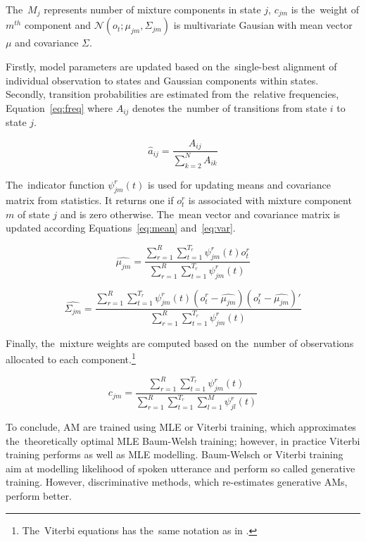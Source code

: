 The~$M_j$ represents number of mixture components in state $j$, $c_{jm}$ is the~weight of $m^{th}$ component and $\mathcal{N}(o_t; \mu_{jm}, \Sigma_{jm})$
is multivariate Gausian with mean vector $\mu$ and covariance $\Sigma$.

Firstly, model parameters are updated based on the~single-best alignment of individual observation to states and Gaussian components within states.
Secondly, transition probabilities are estimated from the~relative frequencies, Equation~\ref{eq:freq} where $A_{ij}$ denotes the~number of transitions from state $i$ to state $j$.

\begin{equation}\label{eq:freq}
    \hat{a}_{ij} = \frac{A_{ij}}{\sum_{k=2}^{N}{A_{ik}}}
\end{equation}

The~indicator function $\psi^r_{jm}(t)$ is used for updating means and covariance matrix from statistics.
It returns one if $o^r_t$ is associated with mixture component $m$ of state $j$ and is zero otherwise.
The~mean vector and covariance matrix is updated according Equations~\ref{eq:mean} and~\ref{eq:var}.

\begin{equation}\label{eq:mean}
    \hat{\mu_{jm}} = \frac{\sum_{r=1}^{R}{\sum_{t=1}^{T_r}{\psi^r_{jm}(t)o^r_t}}}  {\sum_{r=1}^{R}{\sum_{t=1}^{T_r}{\psi^r_{jm}(t)}}}
\end{equation}

\begin{equation}\label{eq:var}
    \hat{\Sigma_{jm}} = \frac{\sum_{r=1}^{R}{\sum_{t=1}^{T_r}{\psi^r_{jm}(t)(o^r_t - \hat{\mu_{jm}})(o^r_t - \hat{\mu_{jm}})'}}}  {\sum_{r=1}^{R}{\sum_{t=1}^{T_r}{\psi^r_{jm}(t)}}}
\end{equation}

Finally, the~mixture weights are computed based on the~number of observations allocated to each component.\footnote{The~Viterbi equations has the~same notation as in \cite{buthpitiya2012parallel}.}

\begin{equation}\label{eq:weights}
    c_{jm} = \frac{\sum_{r=1}^{R}{\sum_{t=1}^{T_r}{\psi^r_{jm}(t)}}} {\sum_{r=1}^{R}{\sum_{t=1}^{T_r}\sum_{l=1}^{M}{\psi^r_{jl}(t)}}}
\end{equation}


To conclude, \ac{AM} are trained using \ac{MLE} or Viterbi training, which approximates the~theoretically optimal \ac{MLE} Baum-Welsh training; however, in practice Viterbi training performs as well as \ac{MLE} modelling.
Baum-Welsch or Viterbi training aim at modelling likelihood of spoken utterance and perform so called generative training.
However, discriminative methods, which re-estimates generative \acp{AM}, perform better.

